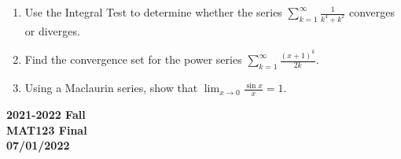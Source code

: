 \documentclass[a4paper, 12pt]{article}
\begin{document}
\begin{enumerate}[leftmargin=*,label=\textbf{\arabic*.}]
\item Use the Integral Test to determine whether the series $\displaystyle\sum_{k=1}^{\infty}\frac1{k^4+k^2}$ converges or diverges.

\item Find the convergence set for the power series  $\displaystyle\sum_{k=1}^\infty\frac{(x+1)^k}{2k}.$

\item Using a Maclaurin series, show that $\displaystyle\lim_{x\to0}\frac{\sin x}x=1$.
\end{enumerate}

\newpage
{}
{}

\begin{center}
\textbf{2021-2022 Fall\\MAT123 Final\\07/01/2022}
\end{center}
\end{document}
